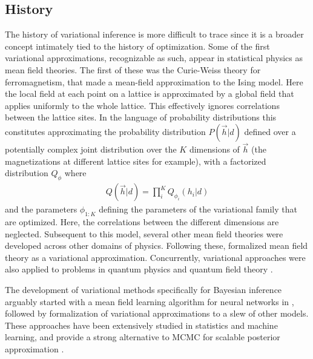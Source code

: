 \subsection{History}

The history of variational inference is more difficult to trace since it is a broader concept intimately tied to the history of optimization. Some of the first variational approximations, recognizable as such, appear in statistical physics as mean field theories. The first of these was the Curie-Weiss theory for ferromagnetism, that made a mean-field approximation to the Ising model\cite{curie1895proprietes,  weiss1907hypothese}. Here the local field at each point on a lattice is approximated by a global field that applies uniformly to the whole lattice. This effectively ignores correlations between the lattice sites. In the language of probability distributions this constitutes approximating the probability distribution $P(\vec{h} | d)$ defined over a potentially complex joint distribution over the $K$ dimensions of $\vec{h}$ (the magnetizations at different lattice sites for example), with a factorized distribution $Q_\phi$ where
\begin{align}
Q(\vec{h}| d) = \prod_{i}^K Q_{\phi_i}(h_i | d)
\end{align}
and the parameters $\phi_{1:K}$ defining the parameters of the variational family that are optimized. Here, the correlations between the different dimensions are neglected. Subsequent to this model, several other mean field theories were developed across other domains of physics. Following these, \citet{landau1965collected} formalized mean field theory as a variational approximation\cite{kadanoff2009more}. Concurrently, variational approaches were also applied to problems in quantum physics and quantum field theory \citep{milton2006electromagnetic, feynman1965quantum}. 

The development of variational methods specifically for Bayesian inference arguably started with a mean field learning algorithm for neural networks in \citet{anderson1987mean}, followed by formalization of variational approximations to a slew of other models\citep{saul1996mean, jaakkola1997variational}. These approaches have been extensively studied in statistics and machine learning, and provide a strong alternative to MCMC for scalable posterior approximation \citep{blei2017variational, jordan1999introduction}.

